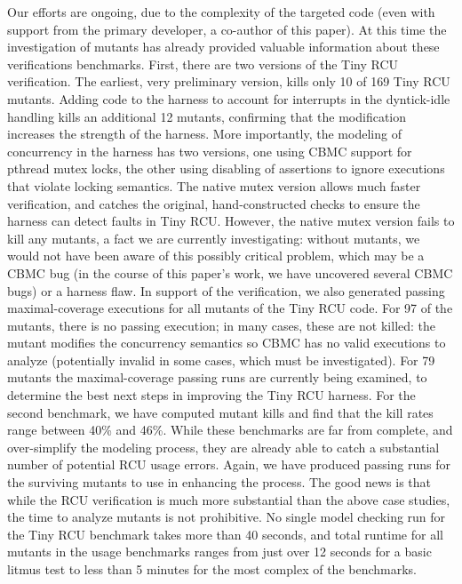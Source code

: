 \documentclass[conference]{IEEEtran}
\begin{document}
Our efforts are ongoing, due to the complexity of the targeted code
(even with support from the primary developer, a co-author of this
paper).  At this time the
investigation of mutants has already provided valuable information
about these verifications benchmarks.  First, there are two versions
of the Tiny RCU verification.  The earliest, very preliminary version,
kills only 10 of 169 Tiny RCU mutants.  Adding code to the harness to
account for interrupts in the dyntick-idle handling kills an
additional 12 mutants, confirming that the modification increases the
strength of the harness.  More importantly, the modeling of
concurrency in the harness has two versions, one using CBMC support
for pthread mutex locks, the other using disabling of assertions to
ignore executions that violate locking semantics.  The native mutex
version allows much faster verification, and catches the original,
hand-constructed checks to ensure the harness can detect faults in
Tiny RCU.  However, the native mutex version fails to kill any
mutants, a fact we are currently investigating:  without mutants, we
would not have been aware of this possibly critical problem, which may
be a CBMC bug (in the course of this paper's work, we have uncovered
several CBMC bugs) or a harness flaw.  In support of the
verification, we also generated passing maximal-coverage executions for all
mutants of the Tiny RCU code.  For 97 of the mutants, there is no
passing execution; in many cases, these are not killed: the mutant
modifies the concurrency semantics so CBMC has no valid executions to
analyze (potentially invalid in some cases, which must be
investigated).  For 79 mutants the maximal-coverage passing runs are
currently being examined, to determine the best next steps in
improving the Tiny RCU harness.
For the second benchmark, we have computed mutant kills and find that
the kill rates range between 40\% and 46\%.  While these benchmarks
are far from complete, and over-simplify the modeling process, they
are already able to catch a substantial number of potential RCU usage
errors.  Again, we have produced passing runs for the surviving
mutants to use in enhancing the process.  The good news is that while
the RCU verification is much more substantial than the above case
studies, the time to analyze mutants is not prohibitive.  No single
model checking run for the Tiny RCU benchmark takes more than 40
seconds, and total runtime for all mutants in the usage
benchmarks ranges from just over 12 seconds for a basic litmus test to
less than 5 minutes for the most complex of the benchmarks.
\end{document}
